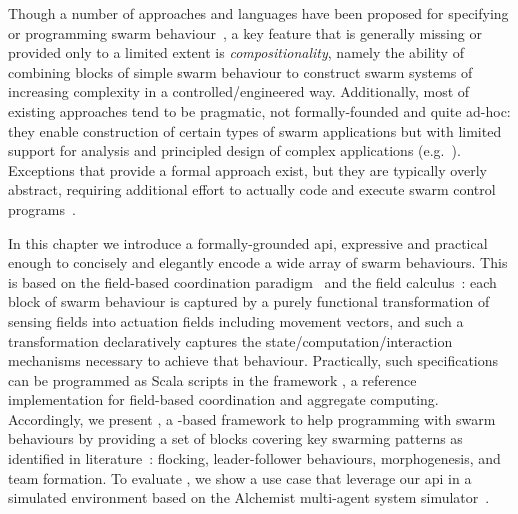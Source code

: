 %
Though a number of approaches and languages have been proposed 
 for specifying or programming swarm behaviour~\cite{Meld2007,%
DBLP:conf/icra/CarrollNS21,%
paros,%
DBLP:conf/isola/KosakHBWHR20,%
Koutsoubelias2016tecola,%
lima2018dolphin,%
Mottola2014voltron,%
DBLP:conf/iros/PinciroliB16,%
DBLP:conf/iros/YiDLD0WY20},
 a key feature that is generally missing or provided only to a limited extent
 is \emph{compositionality},
 namely the ability of combining blocks of simple swarm behaviour to construct swarm systems of increasing complexity in a controlled/engineered way.
%
Additionally, most of existing approaches tend to be pragmatic, not formally-founded and quite ad-hoc: they 
 enable construction of certain types of swarm applications
 but with limited support for analysis and principled design of complex applications (e.g.~\cite{lima2018dolphin,paros,DBLP:conf/iros/PinciroliB16,DBLP:conf/icra/CarrollNS21}).
%
Exceptions that provide a formal approach exist, but they are typically overly abstract, requiring additional effort to actually code and execute swarm control programs~\cite{DBLP:journals/csur/LuckcuckFDDF19}.

In this chapter we introduce a formally-grounded \ac{api},
 expressive and practical enough
 to concisely and elegantly encode a wide array of swarm behaviours.
%
This is based on the field-based coordination paradigm~\cite{DBLP:journals/jlap/ViroliBDACP19} and the field calculus~\cite{AVDPB-TOCL2019}:
each block of swarm behaviour is captured by a purely functional transformation of sensing fields into actuation fields including movement vectors,
and such a transformation declaratively captures the state/computation/interaction mechanisms necessary to achieve that behaviour.
%
Practically, such specifications can be programmed as Scala scripts in the \scafi{} framework \cite{DBLP:journals/softx/CasadeiVAP22,ACDV-LMCS2023}, a reference implementation for field-based coordination and aggregate computing.
%
Accordingly, we present \MacroSwarm{}, a \scafi{}-based framework to help programming with swarm behaviours by providing a set of blocks covering key swarming patterns as identified in literature~\cite{DBLP:journals/swarm/BrambillaFBD13}: flocking, leader-follower behaviours, morphogenesis, and team formation.
%
To evaluate \MacroSwarm{}, we show a use case that leverage our \ac{api} 
 in a simulated environment based on the Alchemist multi-agent system simulator~\cite{DBLP:journals/jos/PianiniMV13}.

%
%
%
%
%
%

